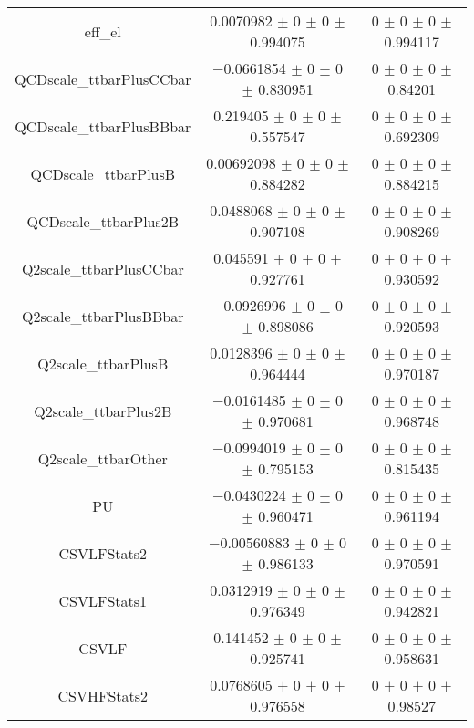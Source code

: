 \begin{table}
\begin{tabular}{ccc}
eff\_el & \num{0.0070982} $\pm$ \num{0} $\pm$ \num{0} $\pm$ \num{0.994075} & \num{0} $\pm$ \num{0} $\pm$ \num{0} $\pm$ \num{0.994117}\\
QCDscale\_ttbarPlusCCbar & \num{-0.0661854} $\pm$ \num{0} $\pm$ \num{0} $\pm$ \num{0.830951} & \num{0} $\pm$ \num{0} $\pm$ \num{0} $\pm$ \num{0.84201}\\
QCDscale\_ttbarPlusBBbar & \num{0.219405} $\pm$ \num{0} $\pm$ \num{0} $\pm$ \num{0.557547} & \num{0} $\pm$ \num{0} $\pm$ \num{0} $\pm$ \num{0.692309}\\
QCDscale\_ttbarPlusB & \num{0.00692098} $\pm$ \num{0} $\pm$ \num{0} $\pm$ \num{0.884282} & \num{0} $\pm$ \num{0} $\pm$ \num{0} $\pm$ \num{0.884215}\\
QCDscale\_ttbarPlus2B & \num{0.0488068} $\pm$ \num{0} $\pm$ \num{0} $\pm$ \num{0.907108} & \num{0} $\pm$ \num{0} $\pm$ \num{0} $\pm$ \num{0.908269}\\
Q2scale\_ttbarPlusCCbar & \num{0.045591} $\pm$ \num{0} $\pm$ \num{0} $\pm$ \num{0.927761} & \num{0} $\pm$ \num{0} $\pm$ \num{0} $\pm$ \num{0.930592}\\
Q2scale\_ttbarPlusBBbar & \num{-0.0926996} $\pm$ \num{0} $\pm$ \num{0} $\pm$ \num{0.898086} & \num{0} $\pm$ \num{0} $\pm$ \num{0} $\pm$ \num{0.920593}\\
Q2scale\_ttbarPlusB & \num{0.0128396} $\pm$ \num{0} $\pm$ \num{0} $\pm$ \num{0.964444} & \num{0} $\pm$ \num{0} $\pm$ \num{0} $\pm$ \num{0.970187}\\
Q2scale\_ttbarPlus2B & \num{-0.0161485} $\pm$ \num{0} $\pm$ \num{0} $\pm$ \num{0.970681} & \num{0} $\pm$ \num{0} $\pm$ \num{0} $\pm$ \num{0.968748}\\
Q2scale\_ttbarOther & \num{-0.0994019} $\pm$ \num{0} $\pm$ \num{0} $\pm$ \num{0.795153} & \num{0} $\pm$ \num{0} $\pm$ \num{0} $\pm$ \num{0.815435}\\
PU & \num{-0.0430224} $\pm$ \num{0} $\pm$ \num{0} $\pm$ \num{0.960471} & \num{0} $\pm$ \num{0} $\pm$ \num{0} $\pm$ \num{0.961194}\\
CSVLFStats2 & \num{-0.00560883} $\pm$ \num{0} $\pm$ \num{0} $\pm$ \num{0.986133} & \num{0} $\pm$ \num{0} $\pm$ \num{0} $\pm$ \num{0.970591}\\
CSVLFStats1 & \num{0.0312919} $\pm$ \num{0} $\pm$ \num{0} $\pm$ \num{0.976349} & \num{0} $\pm$ \num{0} $\pm$ \num{0} $\pm$ \num{0.942821}\\
CSVLF & \num{0.141452} $\pm$ \num{0} $\pm$ \num{0} $\pm$ \num{0.925741} & \num{0} $\pm$ \num{0} $\pm$ \num{0} $\pm$ \num{0.958631}\\
CSVHFStats2 & \num{0.0768605} $\pm$ \num{0} $\pm$ \num{0} $\pm$ \num{0.976558} & \num{0} $\pm$ \num{0} $\pm$ \num{0} $\pm$ \num{0.98527}\\

\end{tabular}
\end{table}
